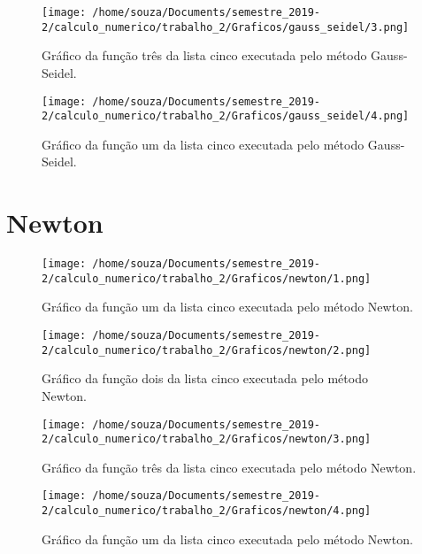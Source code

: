 \documentclass[12pt]{article}
\begin{document}
\begin{figure}[!h]
    \centering
    \texttt{[image: /home/souza/Documents/semestre\_2019-2/calculo\_numerico/trabalho\_2/Graficos/gauss\_seidel/3.png]}
    \caption{Gráfico da função três da lista cinco executada pelo método Gauss-Seidel.}
\end{figure}

\begin{figure}[!h]
    \centering
    \texttt{[image: /home/souza/Documents/semestre\_2019-2/calculo\_numerico/trabalho\_2/Graficos/gauss\_seidel/4.png]}
    \caption{Gráfico da função um da lista cinco executada pelo método Gauss-Seidel.}
\end{figure}

\section{Newton}


\lipsum[2-4]

\begin{figure}[!ht]
    \centering
    \texttt{[image: /home/souza/Documents/semestre\_2019-2/calculo\_numerico/trabalho\_2/Graficos/newton/1.png]}
    \caption{Gráfico da função um da lista cinco executada pelo método Newton.}
\end{figure}

\begin{figure}[!ht]
    \centering
    \texttt{[image: /home/souza/Documents/semestre\_2019-2/calculo\_numerico/trabalho\_2/Graficos/newton/2.png]}
    \caption{Gráfico da função dois da lista cinco executada pelo método Newton.}
\end{figure}

\begin{figure}[!ht]
    \centering
    \texttt{[image: /home/souza/Documents/semestre\_2019-2/calculo\_numerico/trabalho\_2/Graficos/newton/3.png]}
    \caption{Gráfico da função três da lista cinco executada pelo método Newton.}
\end{figure}

\begin{figure}[!ht]
    \centering
    \texttt{[image: /home/souza/Documents/semestre\_2019-2/calculo\_numerico/trabalho\_2/Graficos/newton/4.png]}
    \caption{Gráfico da função um da lista cinco executada pelo método Newton.}
\end{figure}
\end{document}
